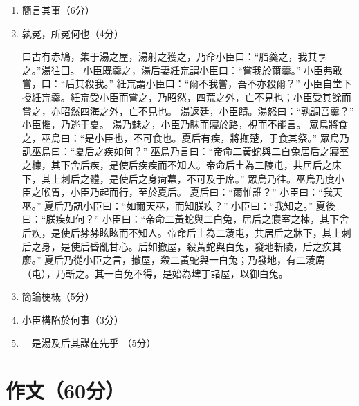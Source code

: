 \documentclass[12pt,a4paper]{article}
\begin{document}
\begin{enumerate}[leftmargin=*, label=\textbf{\arabic*.}, start=18]
    \item 簡言其事（6分）
    
    \vspace{10em}
    
    \item 孰冤，所冤何也（4分）
    
    \vspace{6em}
    
曰古有赤鳩，集于湯之屋，湯射之獲之，乃命小臣曰：“脂羹之，我其享之。”湯往囗。
小臣既羹之，湯后妻紝巟謂小臣曰：“嘗我於爾羹。”
小臣弗敢嘗，曰：“后其殺我。”
紝巟謂小臣曰：“爾不我嘗，吾不亦殺爾？”
小臣自堂下授紝巟羹。紝巟受小臣而嘗之，乃昭然，四荒之外，亡不見也；小臣受其餘而嘗之，亦昭然四海之外，亡不見也。
湯返廷，小臣饋。湯怒曰：“孰調吾羹？”
小臣懼，乃逃于夏。
湯乃魅之，小臣乃眛而寢於路，視而不能言。
眾烏將食之，巫烏曰：“是小臣也，不可食也。夏后有疾，將撫楚，于食其祭。”
眾烏乃訊巫烏曰：“夏后之疾如何？”
巫烏乃言曰：“帝命二黃蛇與二白兔居后之寢室之棟，其下舍后疾，是使后疾疾而不知人。帝命后土為二陵屯，共居后之床下，其上刺后之體，是使后之身疴蠚，不可及于席。”
眾烏乃往。巫烏乃度小臣之喉胃，小臣乃起而行，至於夏后。
夏后曰：“爾惟誰？”
小臣曰：“我天巫。”
夏后乃訊小臣曰：“如爾天巫，而知朕疾？”
小臣曰：“我知之。”
夏後曰：“朕疾如何？”
小臣曰：“帝命二黃蛇與二白兔，居后之寢室之棟，其下舍后疾，是使后棼棼眩眩而不知人。帝命后土為二蓤屯，共居后之牀下，其上刺后之身，是使后昏亂甘心。后如撤屋，殺黃蛇與白兔，發地斬陵，后之疾其廖。”
夏后乃從小臣之言，撤屋，殺二黃蛇與一白兔；乃發地，有二蓤廌（屯），乃斬之。其一白兔不得，是始為埤丁諸屋，以御白兔。   
    
    \item 簡論梗概（5分）
    
    \vspace{8em}
    
    \item 小臣構陷於何事（3分）
    
    \vspace{4em}
    
    \item　是湯及后其謀在先乎 （5分）
    
    \vspace{8em}
\end{enumerate}

\section{作文（60分）}
\end{document}
